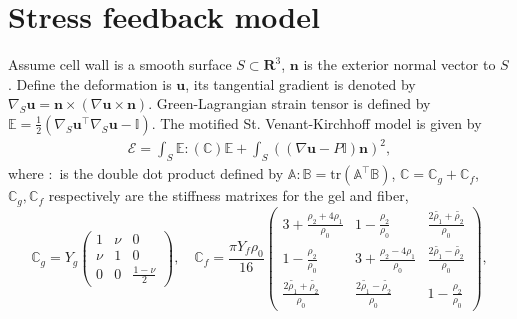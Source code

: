 \documentclass[11pt]{amsart}
\numberwithin{figure}{section}
\theoremstyle{plain}
\theoremstyle{definition}
\numberwithin{equation}{section}
\begin{document}
 
\pagestyle{plain}

\setlength\parskip{1em}

\title{}

\author{}

\date{}


\section{Stress feedback model}
Assume cell wall is a smooth surface $S \subset \mathbf{R}^{3} $, $\bm{n}$ is the exterior normal vector to $S$.
Define the deformation is $\bm{u}$, its tangential gradient is denoted by $\nabla_{S} \bm{u} = \bm{n} \times (\nabla \bm{u} \times \bm{n}) $.
Green-Lagrangian strain tensor is defined by 
$\mathbb{E} = \frac{1}{ 2 } \left(\nabla_{S}\bm{u}^{\top} \nabla_{S}  \bm{u} - \mathbb{I}\right)$.
The motified St. Venant-Kirchhoff model is given by
\begin{align}\label{VK_model}
  \mathcal{E} = \int_S \mathbb{E} : \left(\mathbb{C} \right)\mathbb{E} +  \int_{S} \left( (\nabla \bm{u} - P \mathbb{I})\bm{n}\right)^{2} , 
\end{align}
where $:$ is the double dot product defined by $\mathbb{A}:\mathbb{B} = \text{tr}(\mathbb{A}^{\top} \mathbb{B})$, $\mathbb{C} = \mathbb{C}_{g} + \mathbb{C}_{f} $, 
$\mathbb{C}_{g} , \mathbb{C}_{f} $ respectively are the stiffness matrixes for the gel and fiber,
\[
\mathbb{C}_{g} = Y_{g} \left(
\begin{array}{ccc}
  1 & \nu & 0 \\
  \nu & 1 & 0 \\
  0 & 0 & \frac{ 1-\nu }{ 2 } 
\end{array}
\right), \quad
\mathbb{C}_{f}  = \frac{ \pi Y_{f} \rho_0 }{ 16 } \left(
\begin{array}{ccc}
  3 + \frac{ \rho_2 + 4 \rho_1 }{\rho_0 } & 1- \frac{ \rho_2 }{  \rho_0 } & \frac{ 2\widetilde{\rho_1} + \widetilde{\rho_2}}{\rho_0  }  \\
  1- \frac{ \rho_2 }{  \rho_0 } &  3 + \frac{ \rho_2 - 4 \rho_1 }{\rho_0 } & \frac{ 2\widetilde{\rho_1} - \widetilde{\rho_2}}{\rho_0  }  \\
  \frac{ 2\widetilde{\rho_1} + \widetilde{\rho_2}}{\rho_0  }  & \frac{ 2\widetilde{\rho_1} - \widetilde{\rho_2}}{\rho_0  } &   1- \frac{ \rho_2 }{  \rho_0 } 
\end{array}
\right),
\] 
\end{document}
